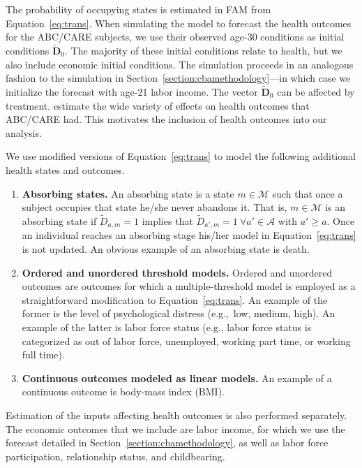 The probability of occupying states is estimated in FAM from Equation~\eqref{eq:trans}. When simulating the model to forecast the health outcomes for the ABC/CARE subjects, we use their observed age-30 conditions as initial conditions  $\tilde{\bm{D}}_0$. The majority of these initial conditions relate to health, but we also include economic initial conditions. The simulation proceeds in an analogous fashion to the simulation in Section~\ref{section:cbamethodology}---in which case we initialize the forecast with age-21 labor income. The vector $\tilde{\bm{D}}_0$ can be affected by treatment. \citet{Campbell_Conti_etal_2014_EarlyChildhoodInvestments} estimate the wide variety of effects on health outcomes that ABC/CARE had. This motivates the inclusion of health outcomes into our analysis.

We use modified versions of Equation~\eqref{eq:trans} to model the following additional health states and outcomes.

\begin{enumerate}
\item \textbf{Absorbing states.} An absorbing state is a state $m \in \mathcal{M}$ such that once a subject occupies that state he/she never abandons it. That is, $m \in \mathcal{M}$ is an absorbing state if $\tilde{D}_{a,m} = 1$ implies that $\tilde{D}_{a',m} = 1 \ \forall a' \in \mathcal{A}$ with $a' \geq a.$ Once an individual reaches an absorbing stage his/her model in Equation~\eqref{eq:trans} is not updated. An obvious example of an absorbing state is death.
\item \textbf{Ordered and unordered threshold models.} Ordered and unordered outcomes are outcomes for which a multiple-threshold model is employed as a straightforward modification to Equation~\eqref{eq:trans}. An example of the former is the level of psychological distress (e.g.,\ low, medium, high). An example of the latter is labor force status (e.g., labor force status is categorized as out of labor force, unemployed, working part time, or working full time).
\item \textbf{Continuous outcomes modeled as linear models.} An example of a continuous outcome is body-mass index (BMI).
\end{enumerate}

Estimation of the inputs affecting health outcomes is also performed separately. The economic outcomes that we include are labor income, for which we use the forecast detailed in Section~\ref{section:cbamethodology}, as well as labor force participation, relationship status, and childbearing. 

